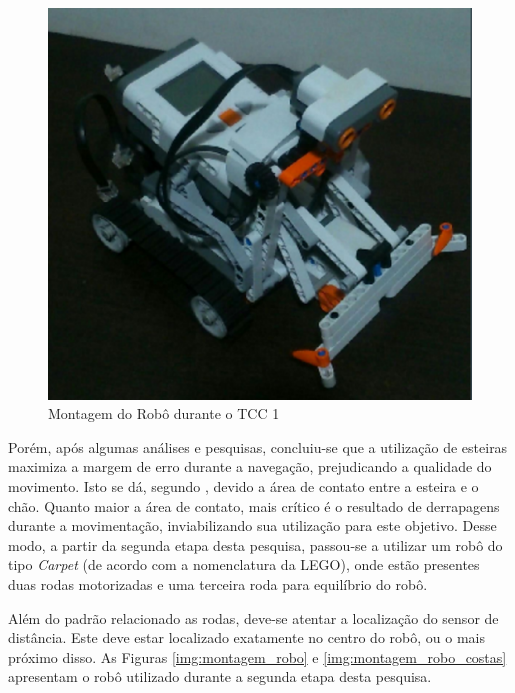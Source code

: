 	\begin{figure}[H]
		\centering
		\includegraphics[scale=0.6]{figuras/montagem_antiga.eps}
		\caption[Montagem do Robô 1]{Montagem do Robô durante o TCC 1}
		\label{img:montagem_antiga}
	\end{figure}

	Porém, após algumas análises e pesquisas, concluiu-se que a utilização de esteiras maximiza a margem de erro durante a navegação, prejudicando a qualidade do movimento. Isto se dá, segundo \cite{legonxj}, devido a área de contato entre a esteira e o chão. Quanto maior a área de contato, mais crítico é o resultado de derrapagens durante a movimentação, inviabilizando sua utilização para este objetivo. Desse modo, a partir da segunda etapa desta pesquisa, passou-se a utilizar um robô do tipo \textit{Carpet} (de acordo com a nomenclatura da LEGO), onde estão presentes duas rodas motorizadas e uma terceira roda para equilíbrio do robô.

	Além do padrão relacionado as rodas, deve-se atentar a localização do sensor de distância. Este deve estar localizado exatamente no centro do robô, ou o mais próximo disso. As Figuras \ref{img:montagem_robo}  e \ref{img:montagem_robo_costas} apresentam o robô utilizado durante a segunda etapa desta pesquisa.

